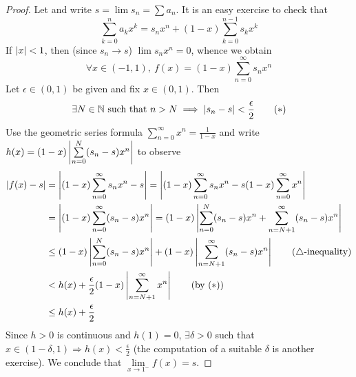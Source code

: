 \begin{proof}
	Let  and write $s=\lim s_n=\sum a_n$. It is an easy exercise to check that
	\[
		\sum_{k=0}^na_kx^k =s_nx^n+(1-x)\sum_{k=0}^{n-1}s_kx^k
	\]
	If $\left| x\right|<1$, then (since $s_n\to s$) $\lim s_nx^n=0$, whence we obtain
	\[
		\forall x\in(-1,1),\ f(x)=(1-x)\sum_{n=0}^{\infty}s_nx^n
	\]
	Let $\epsilon\in(0,1)$ be given and fix $x\in(0,1)$. Then
	\[
		\exists N\in\mathbb{N}\text{ such that }n>N\implies \left| s_n-s\right|<\frac\epsilon 2 \tag{$\ast$}
	\]
	Use the geometric series formula $\sum\limits_{n=0}^{\infty}x^n=\frac 1{1-x}$ and write $h(x)=(1-x)\left| \sum\limits_{n=0}^N(s_n-s)x^n\right|$ to observe
	\begin{align*}
		\left| f(x)-s\right|
		&=\left| (1-x)\sum_{n=0}^{\infty}s_nx^n-s\right| 
		=\left| (1-x)\sum_{n=0}^{\infty}s_nx^n-s(1-x)\sum_{n=0}^{\infty}x^n\right|\\
		&=\left| (1-x)\sum_{n=0}^{\infty}(s_n-s)x^n\right| 
		=(1-x)\left| \sum_{n=0}^N(s_n-s)x^n+\sum_{n=N+1}^\infty(s_n-s)x^n\right|\\
		&\le (1-x)\left| \sum_{n=0}^N(s_n-s)x^n\right|+(1-x)\left| \sum_{n=N+1}^\infty(s_n-s)x^n\right| \tag{$\triangle$-inequality}\\
		&<h(x)+\frac\epsilon 2(1-x)\left| \sum_{n=N+1}^\infty x^n\right| \tag{by ($\ast$)}\\
		&\le h(x)+\frac\epsilon 2
	\end{align*}
	Since $h>0$ is continuous and $h(1)=0$, $\exists \delta>0$ such that $x\in(1-\delta,1)\Longrightarrow h(x)<\frac\epsilon 2$ (the computation of a suitable $\delta$ is another exercise).\medbreak
	We conclude that $\lim\limits_{x\to 1^-}f(x)=s$.
\end{proof}

